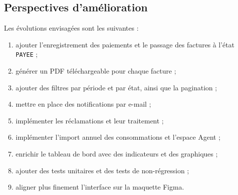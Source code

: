 \subsection{Perspectives d'amélioration}

Les évolutions envisagées sont les suivantes :

\begin{enumerate}[leftmargin=*]
  \item ajouter l'enregistrement des paiements et le passage des factures à l'état \texttt{PAYEE} ;
  \item générer un PDF téléchargeable pour chaque facture ;
  \item ajouter des filtres par période et par état, ainsi que la pagination ;
  \item mettre en place des notifications par e-mail ;
  \item implémenter les réclamations et leur traitement ;
  \item implémenter l'import annuel des consommations et l'espace Agent ;
  \item enrichir le tableau de bord avec des indicateurs et des graphiques ;
  \item ajouter des tests unitaires et des tests de non-régression ;
  \item aligner plus finement l'interface sur la maquette Figma.
\end{enumerate}
